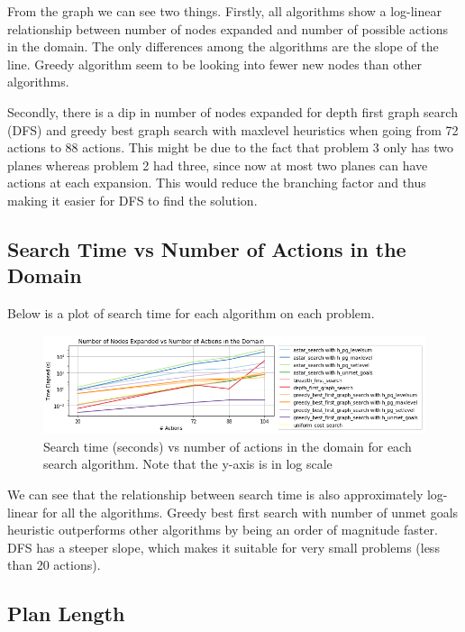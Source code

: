 \documentclass{article}[12pt]
\begin{document}
		
			From the graph we can see two things. Firstly, all algorithms show a log-linear relationship between number of nodes expanded and number of possible actions in the domain. The only differences among the algorithms are the slope of the line. Greedy algorithm seem to be looking into fewer new nodes than other algorithms.
			
			Secondly, there is a dip in number of nodes expanded for depth first graph search (DFS) and greedy best graph search with maxlevel heuristics when going from 72 actions to 88 actions. This might be due to the fact that problem 3 only has two planes whereas problem 2 had three, since now at most two planes can have actions at each expansion. This would reduce the branching factor and thus making it easier for DFS to find the solution.\\
			
		\subsection{Search Time vs Number of Actions in the Domain} \label{ssc:1.2}
		
			Below is a plot of search time for each algorithm on each problem.
			
			\begin{figure}[h!]
				\includegraphics[width=\linewidth]{n_actions_vs_time.png}
				\caption{Search time (seconds) vs number of actions in the domain for each search algorithm. Note that the y-axis is in log scale}
				\label{fig:n_actions_vs_time}
			\end{figure}
			
			We can see that the relationship between search time is also approximately log-linear for all the algorithms. Greedy best first search with number of unmet goals heuristic outperforms other algorithms by being an order of magnitude faster. DFS has a steeper slope, which makes it suitable for very small problems (less than 20 actions).\\
			
		\subsection{Plan Length} \label{ssc:1.3}
			
\end{document}
